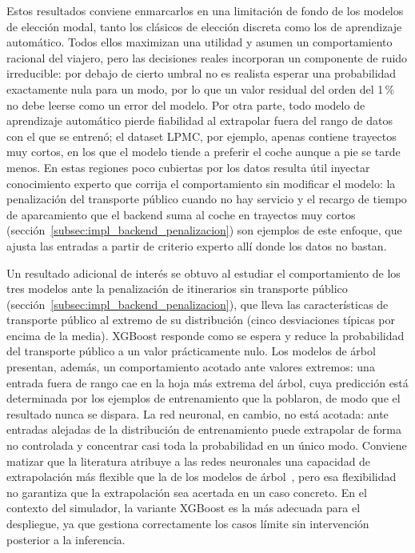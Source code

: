 Estos resultados conviene enmarcarlos en una limitación de fondo de los modelos de elección modal, tanto los clásicos de elección discreta como los de aprendizaje automático. Todos ellos maximizan una utilidad y asumen un comportamiento racional del viajero, pero las decisiones reales incorporan un componente de ruido irreducible: por debajo de cierto umbral no es realista esperar una probabilidad exactamente nula para un modo, por lo que un valor residual del orden del 1\,\% no debe leerse como un error del modelo. Por otra parte, todo modelo de aprendizaje automático pierde fiabilidad al extrapolar fuera del rango de datos con el que se entrenó; el dataset LPMC, por ejemplo, apenas contiene trayectos muy cortos, en los que el modelo tiende a preferir el coche aunque a pie se tarde menos. En estas regiones poco cubiertas por los datos resulta útil inyectar conocimiento experto que corrija el comportamiento sin modificar el modelo: la penalización del transporte público cuando no hay servicio y el recargo de tiempo de aparcamiento que el backend suma al coche en trayectos muy cortos (sección~\ref{subsec:impl_backend_penalizacion}) son ejemplos de este enfoque, que ajusta las entradas a partir de criterio experto allí donde los datos no bastan.

Un resultado adicional de interés se obtuvo al estudiar el comportamiento de los tres modelos ante la penalización de itinerarios sin transporte público (sección~\ref{subsec:impl_backend_penalizacion}), que lleva las características de transporte público al extremo de su distribución (cinco desviaciones típicas por encima de la media). XGBoost responde como se espera y reduce la probabilidad del transporte público a un valor prácticamente nulo. Los modelos de árbol presentan, además, un comportamiento acotado ante valores extremos: una entrada fuera de rango cae en la hoja más extrema del árbol, cuya predicción está determinada por los ejemplos de entrenamiento que la poblaron, de modo que el resultado nunca se dispara. La red neuronal, en cambio, no está acotada: ante entradas alejadas de la distribución de entrenamiento puede extrapolar de forma no controlada y concentrar casi toda la probabilidad en un único modo. Conviene matizar que la literatura atribuye a las redes neuronales una capacidad de extrapolación más flexible que la de los modelos de árbol~\cite{Goodfellow2016}, pero esa flexibilidad no garantiza que la extrapolación sea acertada en un caso concreto. En el contexto del simulador, la variante XGBoost es la más adecuada para el despliegue, ya que gestiona correctamente los casos límite sin intervención posterior a la inferencia.